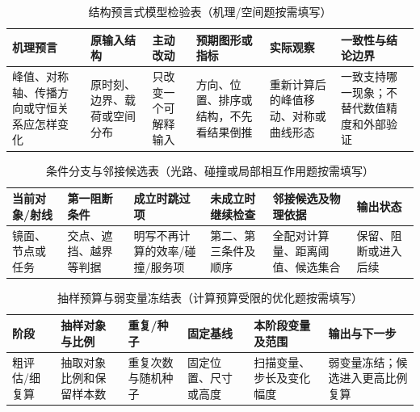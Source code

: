 \documentclass[withoutpreface,bwprint]{cumcmthesis}
\begin{document}
  \begin{table}[H]
    \centering
    \small
    \setlength{\tabcolsep}{3.5pt}
    \caption{结构预言式模型检验表（机理/空间题按需填写）}
    \label{tab:structural-prediction-validation-guide}
    \begin{tabular}{p{2.15cm}p{2.2cm}p{2.05cm}p{2.5cm}p{2.35cm}p{2.35cm}}
      \toprule
      机理预言 & 原输入结构 & 主动改动 & 预期图形或指标 & 实际观察 & 一致性与结论边界 \\
      \midrule
      峰值、对称轴、传播方向或守恒关系应怎样变化 & 原时刻、边界、载荷或空间分布 & 只改变一个可解释输入 & 方向、位置、排序或结构，不先看结果倒推 & 重新计算后的峰值移动、对称或曲线形态 & 一致支持哪一现象；不替代数值精度和外部验证 \\
      \bottomrule
    \end{tabular}
  \end{table}
  \begin{table}[H]
    \centering
    \small
    \setlength{\tabcolsep}{3.5pt}
    \caption{条件分支与邻接候选表（光路、碰撞或局部相互作用题按需填写）}
    \label{tab:conditional-adjacency-guide}
    \begin{tabular}{p{1.8cm}p{2.35cm}p{2.05cm}p{2.35cm}p{2.45cm}p{1.9cm}}
      \toprule
      当前对象/射线 & 第一阻断条件 & 成立时跳过项 & 未成立时继续检查 & 邻接候选及物理依据 & 输出状态 \\
      \midrule
      镜面、节点或任务 & 交点、遮挡、越界等判据 & 明写不再计算的效率/碰撞/服务项 & 第二、第三条件及顺序 & 全配对计算量、距离阈值、候选集合 & 保留、阻断或进入后续 \\
      \bottomrule
    \end{tabular}
  \end{table}
  \begin{table}[H]
    \centering
    \small
    \setlength{\tabcolsep}{3.5pt}
    \caption{抽样预算与弱变量冻结表（计算预算受限的优化题按需填写）}
    \label{tab:sampling-budget-freeze-guide}
    \begin{tabular}{p{1.55cm}p{2.35cm}p{1.7cm}p{2.25cm}p{2.5cm}p{2.4cm}}
      \toprule
      阶段 & 抽样对象与比例 & 重复/种子 & 固定基线 & 本阶段变量及范围 & 输出与下一步 \\
      \midrule
      粗评估/细复算 & 抽取对象比例和保留样本数 & 重复次数与随机种子 & 固定位置、尺寸或高度 & 扫描变量、步长及变化幅度 & 弱变量冻结；候选进入更高比例复算 \\
      \bottomrule
    \end{tabular}
  \end{table}
\fi
\end{document}
